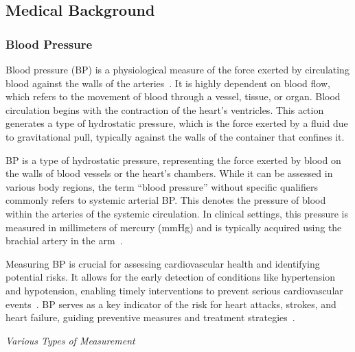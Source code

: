 \subsection{Medical Background}
\label{subsec:med_background}

\subsubsection{Blood Pressure}
\label{subsubsec:bp}

Blood pressure (BP) is a physiological measure of the force exerted by circulating blood against the walls of the arteries~\cite{WhatBloodPressure2019}.
It is highly dependent on blood flow, which refers to the movement of blood through a vessel, tissue, or organ.
Blood circulation begins with the contraction of the heart's ventricles.
This action generates a type of hydrostatic pressure, which is the force exerted by a fluid due to gravitational pull, typically against the walls of the container that confines it.

BP is a type of hydrostatic pressure, representing the force exerted by blood on the walls of blood vessels or the heart's chambers.
While it can be assessed in various body regions, the term \enquote{blood pressure} without specific qualifiers commonly refers to systemic arterial BP\@.
This denotes the pressure of blood within the arteries of the systemic circulation.
In clinical settings, this pressure is measured in millimeters of mercury (mmHg) and is typically acquired using the brachial artery in the arm~\cite{betts20BloodFlow2022}.

Measuring BP is crucial for assessing cardiovascular health and identifying potential risks.
It allows for the early detection of conditions like hypertension and hypotension, enabling timely interventions to prevent serious cardiovascular events~\cite{naylorArterialCathetersEarly2020}.
BP serves as a key indicator of the risk for heart attacks, strokes, and heart failure, guiding preventive measures and treatment strategies~\cite{ettehadBloodPressureLowering2016}.

\vspace{0.2cm}
\textit{Various Types of Measurement}
\vspace{0.2cm}

